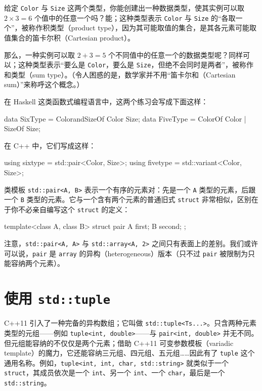 给定 \texttt{Color} 与 \texttt{Size} 这两个类型，你能创建出一种数据类型，使其实例可以取 $2 \times 3 = 6$ 个值中的任意一个吗？能；这种类型表示 \texttt{Color} 与 \texttt{Size} 的“各取一个”，被称作积类型（product type），因为其可能取值的集合，是其各元素可能取值集合的笛卡尔积（Cartesian product）。

那么，一种实例可以取 $2 + 3 = 5$ 个不同值中的任意一个的数据类型呢？同样可以；这种类型表示“要么是 \texttt{Color}，要么是 \texttt{Size}，但绝不会同时是两者”，被称作和类型（sum type）。（令人困惑的是，数学家并不用“笛卡尔和（Cartesian sum）”来称呼这个概念。）

在 Haskell 这类函数式编程语言中，这两个练习会写成下面这样：

\begin{codebox}[cpp]
    data SixType = ColorandSizeOf Color Size;
    data FiveType = ColorOf Color | SizeOf Size;
\end{codebox}

在 C++ 中，它们写成这样：

\begin{codebox}[cpp]
    using sixtype = std::pair<Color, Size>;
    using fivetype = std::variant<Color, Size>;
\end{codebox}

类模板 \texttt{std::\allowbreak{}pair<\allowbreak{}A,\allowbreak{} B>\allowbreak{}} 表示一个有序的元素对：先是一个 \texttt{A} 类型的元素，后跟一个 \texttt{B} 类型的元素。它与一个含有两个元素的普通旧式 \texttt{struct} 非常相似，区别在于你不必亲自编写这个 \texttt{struct} 的定义：

\begin{codebox}[cpp]
    template<class A, class B>
    struct pair {
      A first;
      B second;
    };
\end{codebox}

注意，\texttt{std::\allowbreak{}pair<\allowbreak{}A,\allowbreak{} A>\allowbreak{}} 与 \texttt{std::\allowbreak{}array<\allowbreak{}A,\allowbreak{} 2>\allowbreak{}} 之间只有表面上的差别。我们或许可以说，\texttt{pair} 是 \texttt{array} 的异构（heterogeneous）版本（只不过 \texttt{pair} 被限制为只能容纳两个元素）。

\section{使用 \texttt{std::\allowbreak{}tuple}}

C++11 引入了一种完备的异构数组；它叫做 \texttt{std::\allowbreak{}tuple<\allowbreak{}Ts...>}。只含两种元素类型的元组——例如 \texttt{tuple<\allowbreak{}int,\allowbreak{} double>\allowbreak{}}——与 \texttt{pair<\allowbreak{}int,\allowbreak{} double>\allowbreak{}} 并无不同。但元组能容纳的不仅仅是两个元素；借助 C++11 可变参数模板（variadic template）的魔力，它还能容纳三元组、四元组、五元组……因此有了 \texttt{tuple} 这个通用名称。例如，\texttt{tuple<\allowbreak{}int,\allowbreak{} int,\allowbreak{} char,\allowbreak{} std::\allowbreak{}string>\allowbreak{}} 就类似于一个 \texttt{struct}，其成员依次是一个 \texttt{int}、另一个 \texttt{int}、一个 \texttt{char}，最后是一个 \texttt{std::\allowbreak{}string}。

